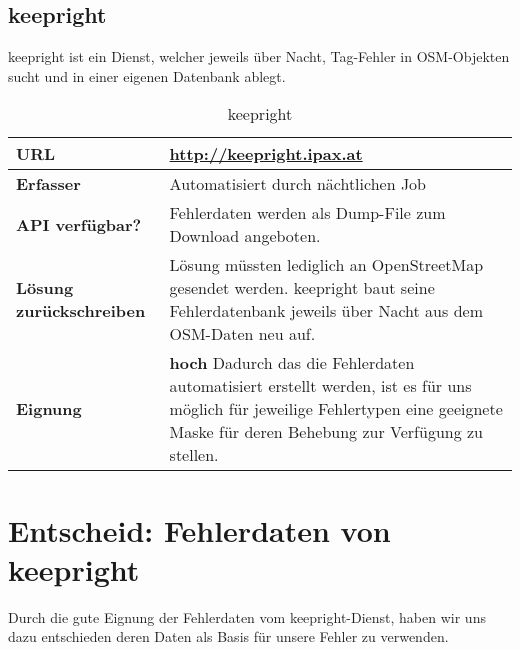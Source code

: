 \subsection{keepright}
keepright ist ein Dienst, welcher jeweils über Nacht, Tag-Fehler in OSM-Objekten sucht und in einer eigenen Datenbank ablegt.

\begin{table}[H]
\centering
\begin{tabular}{|p{0.25\twocelltabwidth}|p{0.75\twocelltabwidth}|}
\hline 
\small{\textbf{URL}} & \url{http://keepright.ipax.at} \\
\hline 
\small{\textbf{Erfasser}} & Automatisiert durch nächtlichen Job \\
\hline 
\small{\textbf{API verfügbar?}} & Fehlerdaten werden als Dump-File zum Download angeboten. \\
\hline 
\small{\textbf{Lösung zurückschreiben}} & Lösung müssten lediglich an OpenStreetMap gesendet werden. keepright baut seine Fehlerdatenbank jeweils über Nacht aus dem OSM-Daten neu auf. \\
\hline
\small{\textbf{Eignung}} & \textbf{hoch} \linebreak Dadurch das die Fehlerdaten automatisiert erstellt werden, ist es für uns möglich für jeweilige Fehlertypen eine geeignete Maske für deren Behebung zur Verfügung zu stellen. \\
\hline
\end{tabular}
\caption{keepright}
\label{datenquellen-keepright}
\end{table}

\section{Entscheid: Fehlerdaten von keepright}
Durch die gute Eignung der Fehlerdaten vom keepright-Dienst, haben wir uns dazu entschieden deren Daten als Basis für unsere Fehler zu verwenden.